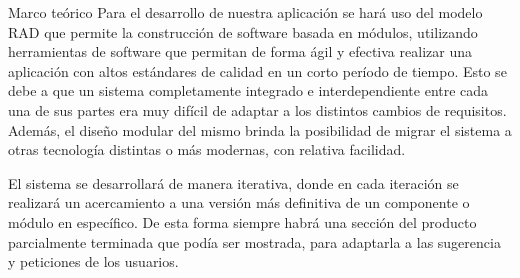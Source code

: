 \begin{thesischapter}{1} {Marco teórico}
    \vspace{2pt}
    Para el desarrollo de nuestra aplicación se hará uso del modelo RAD que permite la construcción de software basada en
    módulos, utilizando herramientas de software que permitan de forma ágil y efectiva realizar una
    aplicación con altos estándares de calidad en un corto período de tiempo. Esto se debe a que un sistema completamente integrado e interdependiente entre cada una de sus
    partes era muy difícil de adaptar a los distintos cambios de requisitos. Además,
    el diseño modular del mismo brinda la posibilidad de migrar el sistema a otras
    tecnología distintas o más modernas, con relativa facilidad.
    
    \vspace{2pt}
    El sistema se desarrollará de manera iterativa, donde en cada iteración se
    realizará un acercamiento a una versión más definitiva de un componente o
    módulo en específico. De esta forma siempre habrá una sección del producto
    parcialmente terminada que podía ser mostrada, para adaptarla a las
    sugerencia y peticiones de los usuarios.

\end{thesischapter}